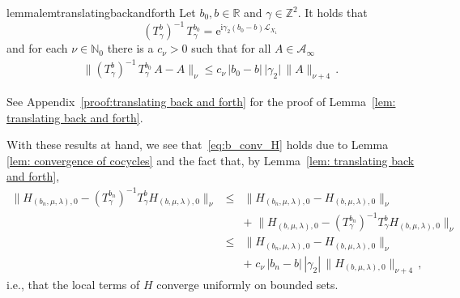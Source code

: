 \documentclass[a4paper]{article}
\newcommand{\e}{\mathrm{e}}
\renewcommand{\i}{\mathrm{i}}
\newcommand{\g}{\gamma}
\newcommand{\N}{\mathbb{N}}
\newcommand{\Z}{\mathbb{Z}}
\newcommand{\mA}{\mathcal{A}}
\newcommand{\R}{\mathbb{R}}
\newcommand{\mL}{\mathcal{L}}
\theoremstyle{plain}
\theoremstyle{definition}
\theoremstyle{remark}
\renewcommand{\(}{\left(}
\renewcommand{\)}{\right)}
\begin{document}
 

\begin{restatable}{lemma}{lemtranslatingbackandforth}\label{lem: translating back and forth}
    Let $b_0, b \in \R$ and $\gamma \in \Z^2$. It holds that 
    $$ (T^{b}_\g)^{-1} \, T^{b_0}_\g = \e^{\i \g_2(b_0-b)\mL_{X_1}}$$
    and for each $\nu \in \N_0$ there is a $c_\nu>0$ such that for all $A\in \mA_\infty$
    \begin{align*}
        \lVert(T^{b}_\g)^{-1} \, T^{b_0}_\g \, A - A \rVert_\nu \leq c_\nu \, \lvert b_0 - b \rvert \, \lvert \g_2 \rvert \, \lVert A \rVert_{\nu+4}\, .
    \end{align*}
\end{restatable}
\noindent See Appendix~\ref{proof:translating back and forth} for the proof of Lemma~\ref{lem: translating back and forth}.

 

\medskip

With these results at hand, we see that~\ref{eq:b_conv_H} holds due to Lemma \ref{lem: convergence of cocycles} and the fact that, by Lemma~\ref{lem: translating back and forth},
\begin{eqnarray}\label{eq:H_compare}
\|H_{(b_n,\mu,\lambda),0} - (T^{b_n}_\gamma )^{-1}T^{b}_\gamma H_{(b,\mu,\lambda),0}\|_\nu &\leq&
\|H_{(b_n,\mu,\lambda),0} -H_{(b,\mu,\lambda),0}\|_\nu
\nonumber\\&&+\; \|H_{(b,\mu,\lambda),0} - (T^{b_n}_\gamma )^{-1}T^{b}_\gamma H_{(b,\mu,\lambda),0}\|_\nu
\nonumber\\
&\leq&
\|H_{(b_n,\mu,\lambda),0} -H_{(b,\mu,\lambda),0}\|_\nu
\nonumber\\&&+\;c_\nu \,  |b_n-b| \,|\gamma_2|\,\|H_{(b,\mu,\lambda),0}\|_{\nu+4}\,,
\end{eqnarray}
i.e., that the local terms of $H$ converge uniformly on bounded sets.
\end{document}
